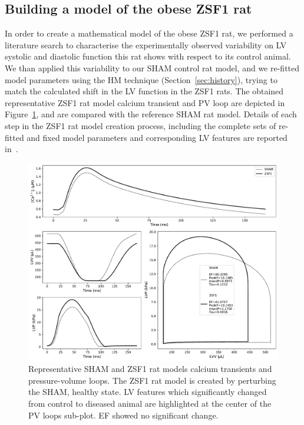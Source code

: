 \subsection{Building a model of the obese ZSF1 rat}\label{sec:buildingzsf1model}
In order to create a mathematical model of the obese ZSF1 rat, we performed a literature search to characterise the experimentally observed variability on LV systolic and diastolic function this rat shows with respect to its control animal. We than applied this variability to our SHAM control rat model, and we re-fitted model parameters using the HM technique (Section~\ref{sec:history}), trying to match the calculated shift in the LV function in the ZSF1 rats. The obtained representative ZSF1 rat model calcium transient and PV loop are depicted in Figure~\ref{fig:shamandzsf1ratmodels}, and are compared with the reference SHAM rat model. Details of each step in the ZSF1 rat model creation process, including the complete sets of re-fitted and fixed model parameters and corresponding LV features are reported in~.

\begin{figure}[!ht]
    \myfloatalign
    \includegraphics[width=\textwidth]{figures/chapter07/w1_resulting_bestfit_ca_and_pvloop.pdf}
    \caption{Representative SHAM and ZSF1 rat models calcium transients and pressure-volume loops. The ZSF1 rat model is created by perturbing the SHAM, healthy state. LV features which significantly changed from control to diseased animal are highlighted at the center of the PV loops sub-plot. EF showed no significant change.}
    \label{fig:shamandzsf1ratmodels}
\end{figure}


